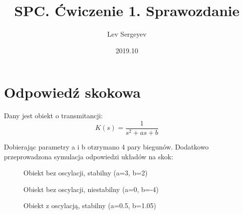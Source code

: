 \documentclass{article}
\author{Lev Sergeyev}
\title{SPC. Ćwiczenie 1. Sprawozdanie}
\date{2019.10}
\begin{document}
\maketitle


\section{Odpowiedź skokowa}
\par
Dany jest obiekt o transmitancji:
\begin{equation}
K(s)=\frac{1}{s^2+as+b} 
\end{equation}
\par
Dobierając parametry a i b otzrymano 4 pary biegunów. Dodatkowo przeprowadzona symulacja odpowiedzi układów na skok:

\begin{figure}
\caption{Obiekt bez oscylacji, stabilny (a=3, b=2)}
\end{figure}

\begin{figure}
\caption{Obiekt bez oscylacji, niestabilny (a=0, b=-4)}
\end{figure}

\begin{figure}
\caption{Obiekt z oscylacją, stabilny (a=0.5, b=1.05)}
\end{figure}
\end{document}
